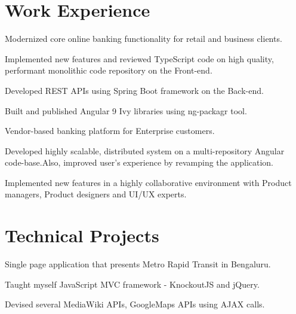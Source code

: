 \documentclass[]{deedy-resume-openfont}
\begin{document}
\begin{minipage}[t]{0.66\textwidth} 


\section{Work Experience}
\vspace{\topsep} %
\begin{tightemize}
\item Modernized core online banking functionality for retail and business clients.
\item Implemented new features and reviewed TypeScript code on high quality, performant monolithic code repository on the Front-end.
\item Developed REST APIs using Spring Boot framework on the Back-end. 
\item Built and published Angular 9 Ivy libraries using ng-packagr tool.
\end{tightemize}
\sectionsep
{}
\begin{tightemize}
\item Vendor-based banking platform for Enterprise customers.
\item Developed highly scalable, distributed system on a multi-repository  Angular code-base.Also, improved user's experience by revamping the application.
\item Implemented new features in a highly collaborative environment with Product managers, Product designers and UI/UX experts.
\end{tightemize}
\sectionsep



\section{Technical Projects}
\begin{tightemize}
\item Single page application that presents Metro Rapid Transit in Bengaluru.
\item Taught myself JavaScript MVC framework - KnockoutJS and jQuery.
\item Devised several MediaWiki APIs, GoogleMaps APIs using AJAX calls.  
\end{tightemize}
\sectionsep


\end{minipage}
\end{document}
